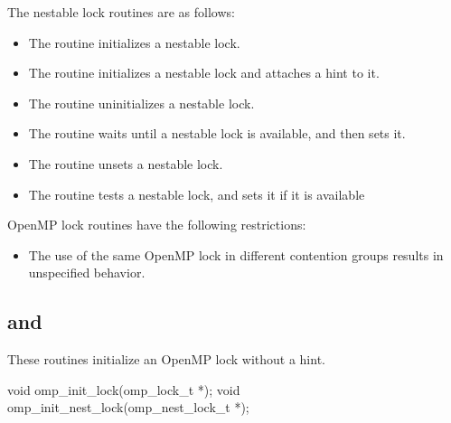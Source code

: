 The nestable lock routines are as follows:

\begin{itemize}
\item The  routine initializes a nestable lock.

\item The  routine initializes a nestable lock and attaches a hint to it.

\item The  routine uninitializes a nestable lock.

\item The  routine waits until a nestable lock is available, and then 
sets it.

\item The  routine unsets a nestable lock.

\item The  routine tests a nestable lock, and sets it if it is 
available
\end{itemize}

\restrictions
OpenMP lock routines have the following restrictions:

\begin{itemize}
\item The use of the same OpenMP lock in different contention groups results in 
unspecified behavior. 
\end{itemize}










\subsection{ and }
\label{subsec:omp_init_lock and omp_init_nest_lock}
\summary
These routines initialize an OpenMP lock without a hint.

\format
\begin{ccppspecific}
\begin{boxedcode}
void omp\_init\_lock(omp\_lock\_t *);
void omp\_init\_nest\_lock(omp\_nest\_lock\_t *);
\end{boxedcode}
\end{ccppspecific}

